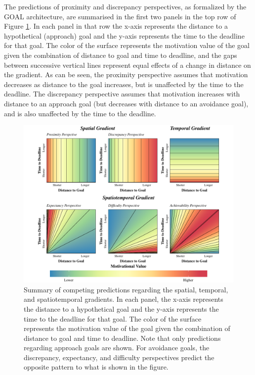 \documentclass[a4paper,doc,natbib,donotrepeattitle]{apa6}
\begin{document}
The predictions of proximity and discrepancy perspectives, as formalized by the GOAL architecture, are summarised in the first two panels in the top row of Figure \ref{fig:hypothetical_gradients}. In each panel in that row the x-axis represents the distance to a hypothetical (approach) goal and the y-axis represents the time to the deadline for that goal. The color of the surface represents the motivation value of the goal given the combination of distance to goal and time to deadline, and the gaps between successive vertical lines represent equal effects of a change in distance on the gradient. As can be seen, the proximity perspective assumes that motivation decreases as distance to the goal increases, but is unaffected by the time to the deadline. The discrepancy perspective assumes that motivation increases with distance to an approach goal (but decreases with distance to an avoidance goal), and is also unaffected by the time to the deadline.

\begin{figure}[h!]
\centering
\includegraphics[width=1\textwidth]{hypothetical_gradients.pdf}
\caption{\label{fig:hypothetical_gradients} Summary of competing predictions regarding the spatial, temporal, and spatiotemporal gradients. In each panel, the x-axis represents the distance to a hypothetical goal and the y-axis represents the time to the deadline for that goal. The color of the surface represents the motivation value of the goal given the combination of distance to goal and time to deadline. Note that only predictions regarding approach goals are shown. For avoidance goals, the discrepancy, expectancy, and difficulty perspectives predict the opposite pattern to what is shown in the figure. }
\end{figure}
\end{document}
